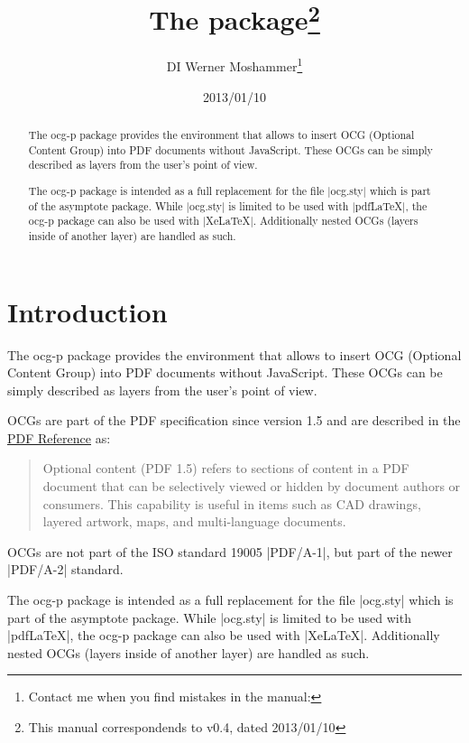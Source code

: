 \documentclass[a4paper]{ltxdoc}
\title{The \pkg{ocg-p} package\thanks{This manual correspondends to \pkg{ocg-p} v0.4, dated 2013/01/10}}
\author{DI Werner Moshammer\thanks{Contact me when you find mistakes in the manual: \mail{sendmail.werner@gmail.com}}}
\date{2013/01/10}
\newcommand*{\pkg}[1]{\textsf{#1}}
\begin{document}
\maketitle

\tableofcontents



\begin{abstract}
The \pkg{ocg-p} package provides the environment that allows to insert OCG (Optional Content Group) into PDF documents without JavaScript. These OCGs can be simply described as layers from the user's point of view. 

The \pkg{ocg-p} package is intended as a full replacement for the file |ocg.sty| which is part of the \pkg{asymptote} package. While |ocg.sty| is limited to be used with |pdfLaTeX|, the \pkg{ocg-p} package can also be used with |XeLaTeX|. Additionally nested OCGs (layers inside of another layer) are handled as such.

\end{abstract}
\newpage

\section{Introduction}
The \pkg{ocg-p} package provides the environment that allows to insert OCG (Optional Content Group) into PDF documents without JavaScript. These OCGs can be simply described as layers from the user's point of view.

OCGs are part of the PDF specification since version 1.5 and are described in the \href{http://wwwimages.adobe.com/www.adobe.com/content/dam/Adobe/en/devnet/pdf/pdfs/pdf_reference_archives/PDFReference15_v5.pdf}{PDF Reference} as:

\begin{quote}
Optional content (PDF 1.5) refers to sections of content in a PDF document that
can be selectively viewed or hidden by document authors or consumers. This capability
is useful in items such as CAD drawings, layered artwork, maps, and
multi-language documents.
\end{quote} 

OCGs are not part of the ISO standard 19005 |PDF/A-1|, but part of the newer |PDF/A-2| standard.

The \pkg{ocg-p} package is intended as a full replacement for the file |ocg.sty| which is part of the \pkg{asymptote} package. While |ocg.sty| is limited to be used with |pdfLaTeX|, the \pkg{ocg-p} package can also be used with |XeLaTeX|. Additionally nested OCGs (layers inside of another layer) are handled as such.
\end{document}
